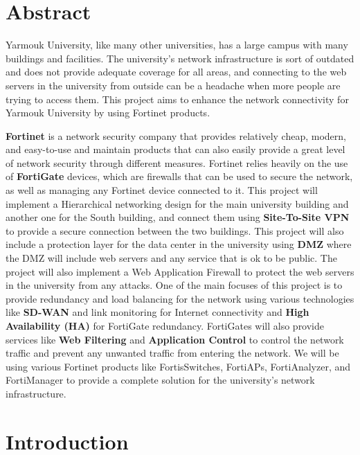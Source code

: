 \documentclass[12pt]{report}
\begin{document}
\newpage
\tableofcontents
\newpage
\listoftables
\newpage
\listoffigures

\newpage
\chapter*{Abstract}
Yarmouk University, like many other universities, 
has a large campus with many buildings and facilities. 
The university's network infrastructure is sort of outdated and does not provide 
adequate coverage for all areas, and connecting to the web servers in the university from outside can 
be a headache when more people are trying to access them.
This project aims to enhance the network connectivity for Yarmouk University 
by using Fortinet products. 

\textbf{Fortinet} is a network security company that provides relatively cheap, modern, and easy-to-use and maintain products that can also easily provide a great level of network security through different measures.
Fortinet relies heavily on the use of \textbf{FortiGate} devices, which are firewalls that can be used to secure the network, as well as managing any Fortinet device connected to it.
This project will implement a Hierarchical networking design for the main university building and another one for the South building, and connect them using \textbf{Site-To-Site VPN} to provide a secure connection between the two buildings.
This project will also include a protection layer for the data center in the university using \textbf{DMZ} where the DMZ will include web servers and any service that is ok to be public.
The project will also implement a Web Application Firewall to protect the web servers in the university from any attacks.
One of the main focuses of this project is to provide redundancy and load balancing for the network using 
various technologies like \textbf{SD-WAN} and link monitoring for Internet connectivity and \textbf{High Availability (HA)} for FortiGate redundancy.
FortiGates will also provide services like \textbf{Web Filtering} and \textbf{Application Control} to control the network traffic and prevent any unwanted traffic from entering the network.
We will be using various Fortinet products like FortisSwitches, FortiAPs, FortiAnalyzer, and FortiManager to provide a complete solution for the university's network infrastructure.

\clearpage
{}
\chapter{Introduction}
\end{document}
